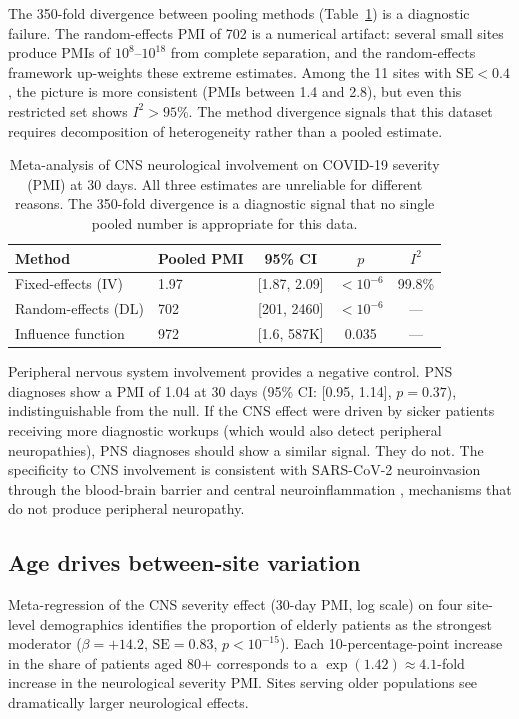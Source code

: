 \documentclass{article}
\begin{document}
The 350-fold divergence between pooling methods (Table~\ref{tab:meta}) is a
diagnostic failure.  The random-effects PMI of 702 is a numerical artifact:
several small sites produce PMIs of $10^{8}$--$10^{18}$ from complete
separation, and the random-effects framework up-weights these extreme
estimates.  Among the 11 sites with $\text{SE} < 0.4$, the picture is more
consistent (PMIs between 1.4 and 2.8), but even this restricted set shows
$I^2 > 95\%$.  The method divergence signals that this dataset requires
decomposition of heterogeneity rather than a pooled estimate.

\begin{table}[t]
\centering
\caption{Meta-analysis of CNS neurological involvement on COVID-19 severity
(PMI) at 30 days.  All three estimates are unreliable for different reasons.
The 350-fold divergence is a diagnostic signal that no single pooled number
is appropriate for this data.}
\label{tab:meta}
\begin{tabular}{llccc}
\toprule
Method & Pooled PMI & 95\% CI & $p$ & $I^2$ \\
\midrule
Fixed-effects (IV) & 1.97 & [1.87, 2.09] & $< 10^{-6}$ & 99.8\% \\
Random-effects (DL) & 702 & [201, 2460] & $< 10^{-6}$ & --- \\
Influence function & 972 & [1.6, 587K] & 0.035 & --- \\
\bottomrule
\end{tabular}
\end{table}

Peripheral nervous system involvement provides a negative control.  PNS
diagnoses show a PMI of 1.04 at 30 days (95\% CI: [0.95, 1.14],
$p = 0.37$), indistinguishable from the null.  If the CNS effect were
driven by sicker patients receiving more diagnostic workups (which would
also detect peripheral neuropathies), PNS diagnoses should show a similar
signal.  They do not.  The specificity to CNS involvement is consistent
with SARS-CoV-2 neuroinvasion through the blood-brain barrier
\cite{song2021neuroinvasion} and central neuroinflammation
\cite{iadecola2020covid}, mechanisms that do not produce peripheral
neuropathy.


\subsection{Age drives between-site variation}

Meta-regression of the CNS severity effect (30-day PMI, log scale) on four
site-level demographics identifies the proportion of elderly patients as the
strongest moderator ($\beta = +14.2$, $\text{SE} = 0.83$,
$p < 10^{-15}$).  Each 10-percentage-point increase in the share of
patients aged 80+ corresponds to a $\exp(1.42) \approx 4.1$-fold increase
in the neurological severity PMI.  Sites serving older populations see
dramatically larger neurological effects.
\end{document}
